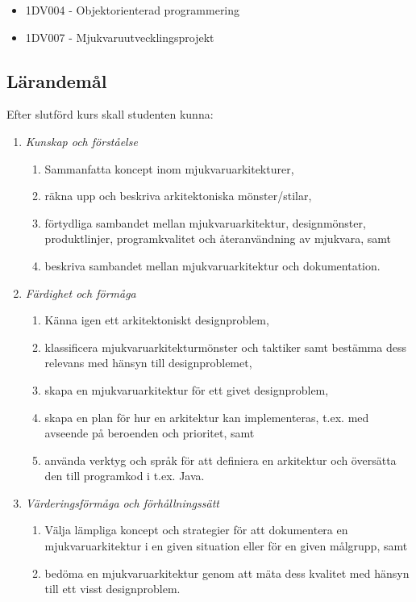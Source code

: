 \begin{itemize}
\tightlist
\item
  1DV004 - Objektorienterad programmering
\item
  1DV007 - Mjukvaruutvecklingsprojekt
\end{itemize}

\subsection*{Lärandemål}

Efter slutförd kurs skall studenten kunna:

\begin{enumerate}
\def\labelenumi{\Alph{enumi}.}
\tightlist
\item
  \emph{Kunskap och förståelse}

  \begin{enumerate}
  \def\labelenumii{\Alph{enumi}.\arabic{enumii}.}
  \tightlist
  \item
    Sammanfatta koncept inom mjukvaruarkitekturer,
  \item
    räkna upp och beskriva arkitektoniska mönster/stilar,
  \item
    förtydliga sambandet mellan mjukvaruarkitektur, designmönster,
    produktlinjer, programkvalitet och återanvändning av mjukvara, samt
  \item
    beskriva sambandet mellan mjukvaruarkitektur och dokumentation.
  \end{enumerate}
\item
  \emph{Färdighet och förmåga}

  \begin{enumerate}
  \def\labelenumii{\Alph{enumi}.\arabic{enumii}.}
  \tightlist
  \item
    Känna igen ett arkitektoniskt designproblem,
  \item
    klassificera mjukvaruarkitekturmönster och taktiker samt bestämma
    dess relevans med hänsyn till designproblemet,
  \item
    skapa en mjukvaruarkitektur för ett givet designproblem,
  \item
    skapa en plan för hur en arkitektur kan implementeras, t.ex. med
    avseende på beroenden och prioritet, samt
  \item
    använda verktyg och språk för att definiera en arkitektur och
    översätta den till programkod i t.ex. Java.
  \end{enumerate}
\item
  \emph{Värderingsförmåga och förhållningssätt}

  \begin{enumerate}
  \def\labelenumii{\Alph{enumi}.\arabic{enumii}.}
  \tightlist
  \item
    Välja lämpliga koncept och strategier för att dokumentera en
    mjukvaruarkitektur i en given situation eller för en given målgrupp,
    samt
  \item
    bedöma en mjukvaruarkitektur genom att mäta dess kvalitet med hänsyn
    till ett visst designproblem.
  \end{enumerate}
\end{enumerate}

